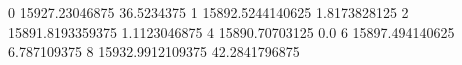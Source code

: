 0 15927.23046875 36.5234375
1 15892.5244140625 1.8173828125
2 15891.8193359375 1.1123046875
4 15890.70703125 0.0
6 15897.494140625 6.787109375
8 15932.9912109375 42.2841796875
